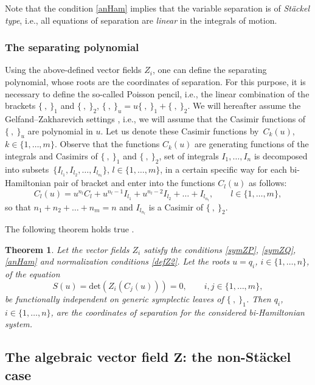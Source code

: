 \documentclass[pdftex]{sigma}
\numberwithin{equation}{section}
\newtheorem{Theorem}{Theorem}[section]
\begin{document}
\begin{Remark}
 Note that the condition \eqref{anHam} implies that the variable separation is of {\it St\"ackel type}, i.e., all equations of separation are {\it linear} in the integrals of motion.
\end{Remark}

\subsubsection{ The separating polynomial}
 Using the above-defined
vector fields $Z_i$, one can define the separating polynomial, whose roots
 are the coordinates of separation. For this purpose, it is
necessary to define the so-called Poisson pencil, i.e., the
linear combination of the brackets $\{\ ,\ \}_1$ and $\{\ ,\
\}_2$,
$
\{\ ,\ \}_u=u \{\ ,\ \}_1+ \{\ ,\ \}_2$.
We will hereafter assume the Gelfand--Zakharevich settings
\cite{GZ}, i.e., we will assume that the Casimir functions of $\{\ ,\ \}_u$ are
polynomial in $u$. Let us denote these Casimir functions by~$C_k(u)$, $k\in \{1, \dots, m\}$. Observe that the functions
$C_k(u)$ are generating functions of the integrals and Casimirs of
$\{\ ,\ \}_1$ and $\{\ ,\ \}_2$, set of integrals
$I_1, \dots , I_n$ is decomposed into subsets~${\{I_{l_1}, I_{l_2},
\dots , I_{l_{n_l}}\}}$, $l\in \{1, \dots, m\}$, in a certain specific way
for each bi-Hamiltonian pair of bracket and enter into the
functions $C_l(u)$ as follows:
\begin{equation}\label{Casu}
C_l(u)=u^{n_l}C_l+ u^{n_l-1} I_{l_1}+ u^{n_l-2} I_{l_2}+ \dots +
I_{l_{n_l}}, \qquad l\in \{1,\dots, m\},
\end{equation}
so that $n_1+n_2+ \dots +n_m=n$ and $I_{l_{n_l}}$ is a Casimir of $\{\
,\ \}_2$.

The following theorem holds true \cite{MFP,FP,FP2}.
\begin{Theorem}\label{MFP}
Let the vector fields $Z_i$ satisfy the conditions \eqref{symZP}, \eqref{symZQ}, \eqref{anHam} and normalization conditions
\eqref{defZ2}.
Let the roots $u=q_i$, $i\in \{1,\dots, n\}$, of the equation
\[%
S(u)=\mathrm{det}(Z_i(C_j(u)))=0, \qquad i,j \in \{1,\dots, m\},
\]
be functionally independent on generic symplectic leaves of $\{\ ,\ \}_1$. Then $q_i$, $i\in \{1, \dots, n\}$, are the coordinates of separation for the considered
bi-Hamiltonian system.
\end{Theorem}

\subsection[The algebraic vector field Z: the non-St\"ackel case]{The algebraic vector field $\boldsymbol{Z}$: the non-St\"ackel case}
\end{document}
